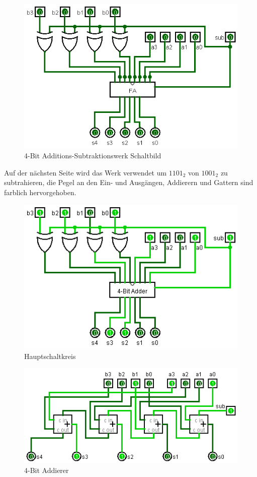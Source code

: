 \documentclass{article}
\begin{document}
\begin{enumerate}[label=(\alph*)]
\begin{figure}[h]
\begin{center}
    \includegraphics[width=12cm]{addsub_circuit.png}
    4-Bit Additions-Subtraktionswerk Schaltbild
\end{center}
\end{figure}

Auf der nächsten Seite wird das Werk verwendet um $1101_2$ von $1001_2$ zu subtrahieren, die Pegel an den Ein- und Ausgängen, Addierern und Gattern sind farblich hervorgehoben.

\begin{figure}[t]
\begin{center}
    \includegraphics[width=12cm]{addsub_main_circuit_marked.png}
    Hauptschaltkreis
\end{center}
\end{figure}

\begin{figure}[t]
\begin{center}
    \includegraphics[width=12cm]{addsub_blck_circuit_marked.png}
    4-Bit Addierer
\end{center}
\end{figure}

\end{enumerate}
\end{document}
